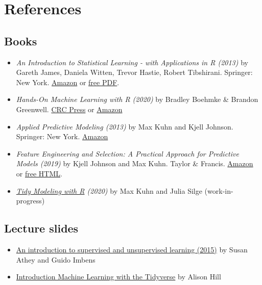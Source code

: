 \documentclass[
]{book}
\begin{document}
\hypertarget{references-2}{%
\section{References}\label{references-2}}

\hypertarget{books}{%
\subsection{Books}\label{books}}

\begin{itemize}
\item
  \emph{An Introduction to Statistical Learning - with Applications in R (2013)} by Gareth James, Daniela Witten, Trevor Hastie, Robert Tibshirani. Springer: New York. \href{https://www.amazon.com/Introduction-Statistical-Learning-Applications-Statistics/dp/1461471370}{Amazon} or \href{http://www-bcf.usc.edu/~gareth/ISL/}{free PDF}.
\item
  \emph{Hands-On Machine Learning with R (2020)} by Bradley Boehmke \& Brandon Greenwell. \href{https://www.routledge.com/Hands-On-Machine-Learning-with-R/Boehmke-Greenwell/p/book/9781138495685}{CRC Press} or \href{https://www.amazon.com/gp/product/1138495689?pf_rd_p=ab873d20-a0ca-439b-ac45-cd78f07a84d8\&pf_rd_r=JBRX0ZJ1WFSR9T3JPTQE}{Amazon}
\item
  \emph{Applied Predictive Modeling (2013)} by Max Kuhn and Kjell Johnson. Springer: New York. \href{https://www.amazon.com/Applied-Predictive-Modeling-Max-Kuhn/dp/1461468485?SubscriptionId=0ENGV10E9K9QDNSJ5C82\&tag=apm0a-20\&linkCode=xm2\&camp=2025\&creative=165953\&creativeASIN=1461468485}{Amazon}
\item
  \emph{Feature Engineering and Selection: A Practical Approach for Predictive Models (2019)} by Kjell Johnson and Max Kuhn. Taylor \& Francis. \href{http://www.feat.engineering/}{Amazon} or \href{http://www.feat.engineering/}{free HTML}.
\item
  \emph{\href{https://www.tmwr.org/}{Tidy Modeling with R} (2020)} by Max Kuhn and Julia Silge (work-in-progress)
\end{itemize}

\hypertarget{lecture-slides}{%
\subsection{Lecture slides}\label{lecture-slides}}

\begin{itemize}
\item
  \href{https://www.nber.org/econometrics_minicourse_2015/nber_slides11.pdf}{An introduction to supervised and unsupervised learning (2015)} by Susan Athey and Guido Imbens
\item
  \href{https://education.rstudio.com/blog/2020/02/conf20-intro-ml/}{Introduction Machine Learning with the Tidyverse} by Alison Hill
\end{itemize}
\end{document}
